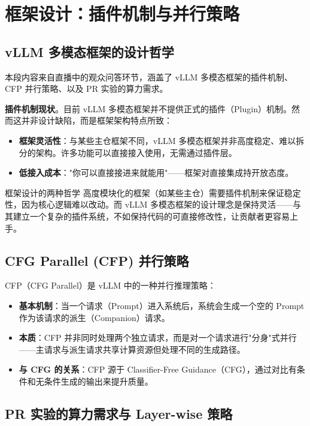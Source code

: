 \documentclass[a4paper]{article}
\begin{document}
\newpage
\section{框架设计：插件机制与并行策略}

\subsection{vLLM 多模态框架的设计哲学}

本段内容来自直播中的观众问答环节，涵盖了 vLLM 多模态框架的插件机制、CFP 并行策略、以及 PR 实验的算力需求。

\textbf{插件机制现状}。目前 vLLM 多模态框架并不提供正式的插件（Plugin）机制。然而这并非设计缺陷，而是框架架构特点所致：

\begin{itemize}
\item \textbf{框架灵活性}：与某些主仓框架不同，vLLM 多模态框架并非高度稳定、难以拆分的架构。许多功能可以直接接入使用，无需通过插件层。
\item \textbf{低接入成本}："你可以直接接进来就能用"——框架对直接集成持开放态度。
\end{itemize}

\begin{knowledgebox}{框架设计的两种哲学}
高度模块化的框架（如某些主仓）需要插件机制来保证稳定性，因为核心逻辑难以改动。而 vLLM 多模态框架的设计理念是保持灵活——与其建立一个复杂的插件系统，不如保持代码的可直接修改性，让贡献者更容易上手。
\end{knowledgebox}

\subsection{CFG Parallel (CFP) 并行策略}

CFP（CFG Parallel）是 vLLM 中的一种并行推理策略：

\begin{itemize}
\item \textbf{基本机制}：当一个请求（Prompt）进入系统后，系统会生成一个空的 Prompt 作为该请求的派生（Companion）请求。
\item \textbf{本质}：CFP 并非同时处理两个独立请求，而是对一个请求进行"分身"式并行——主请求与派生请求共享计算资源但处理不同的生成路径。
\item \textbf{与 CFG 的关系}：CFP 源于 Classifier-Free Guidance（CFG），通过对比有条件和无条件生成的输出来提升质量。
\end{itemize}

\subsection{PR 实验的算力需求与 Layer-wise 策略}
\end{document}
